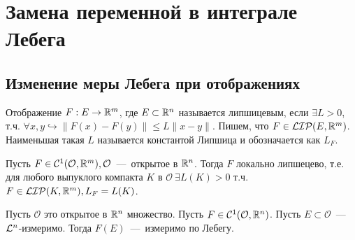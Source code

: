 
\section{Замена переменной в интеграле Лебега}
\subsection{Изменение меры Лебега при отображениях}
\begin{reminder}
    Отображение $F: E \rightarrow \mathbb{R}^m$, где $E \subset \mathbb{R}^n$ называется липшицевым, если $\exists L > 0$, т.ч. $\forall x, y \hookrightarrow \|F(x) - F(y)\| \leq L\|x - y\|$. Пишем, что $F \in \mathcal{LIP}(E, \mathbb{R}^m)$. Наименьшая такая $L$ называется константой Липшица и обозначается как $L_F$.
\end{reminder}
\begin{fact}
    Пусть $F \in \mathcal{C}^1(\mathcal{O}, \mathbb{R}^m), \mathcal{O}$~---~открытое в $\mathbb{R}^n$. Тогда $F$ локально липшецево, т.е. для любого выпуклого компакта $K$ в $\mathcal{O} \   \exists L(K) > 0$ т.ч. $F \in \mathcal{LIP}(K, \mathbb{R}^m), L_F = L(K)$.
\end{fact}
\begin{theorem}
    Пусть $\mathcal{O}$ это открытое в $\mathbb{R}^n$ множество. Пусть $F \in \mathcal{C}^1(\mathcal{O}, \mathbb{R}^n)$. Пусть $E \subset \mathcal{O}$~---~$\mathcal{L}^n$-измеримо. Тогда $F(E)$~---~измеримо по Лебегу.
\end{theorem}
